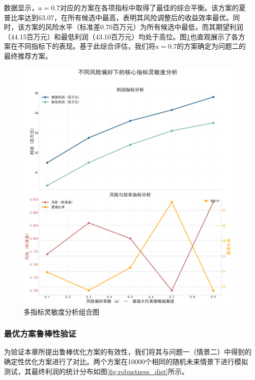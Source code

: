 数据显示，$a=0.7$对应的方案在各项指标中取得了最佳的综合平衡。该方案的夏普比率达到63.07，在所有候选中最高，表明其风险调整后的收益效率最优。同时，该方案的风险水平（标准差0.70百万元）为所有候选中最低，而其期望利润（44.15百万元）和最低利润（43.10百万元）均处于高位。图\ref{fig:sensitivity_combo}也直观展示了各方案在不同指标下的表现。基于此综合评估，我们将$a=0.7$的方案确定为问题二的最终推荐方案。

\begin{figure}[H]
    \centering
    \includegraphics[width=\textwidth]{figs/4问题二/多指标灵敏度分析组合图.png}
    \caption{多指标灵敏度分析组合图}
    \label{fig:sensitivity_combo}
\end{figure}

\subsubsection{最优方案鲁棒性验证}
为验证本章所提出鲁棒优化方案的有效性，我们将其与问题一（情景二）中得到的确定性优化方案进行了对比。两个方案在10000个相同的随机未来情景下进行模拟测试，其最终利润的统计分布如图\ref{fig:robustness_dist}所示。

